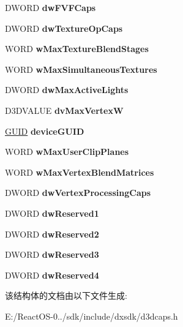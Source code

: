 \begin{DoxyCompactItemize}
D\+W\+O\+RD {\bfseries dw\+F\+V\+F\+Caps}
\item 
\mbox{\label{struct___d3_d_device_desc7_a92577a9b229bc365e67535f20320529f}} 
D\+W\+O\+RD {\bfseries dw\+Texture\+Op\+Caps}
\item 
\mbox{\label{struct___d3_d_device_desc7_aa52fdfb0dc28922bd58de3bf428ebde5}} 
W\+O\+RD {\bfseries w\+Max\+Texture\+Blend\+Stages}
\item 
\mbox{\label{struct___d3_d_device_desc7_a1a428ca5f09dbae0e6838d95a83d3f6e}} 
W\+O\+RD {\bfseries w\+Max\+Simultaneous\+Textures}
\item 
\mbox{\label{struct___d3_d_device_desc7_a74dd8fd7b928f20f76b94ab02b82de08}} 
D\+W\+O\+RD {\bfseries dw\+Max\+Active\+Lights}
\item 
\mbox{\label{struct___d3_d_device_desc7_af8748cda866462ea4e95cd61d3488007}} 
D3\+D\+V\+A\+L\+UE {\bfseries dv\+Max\+VertexW}
\item 
\mbox{\label{struct___d3_d_device_desc7_a38f18a2052de8d4eda540738034bbf5a}} 
\hyperlink{interface_g_u_i_d}{G\+U\+ID} {\bfseries device\+G\+U\+ID}
\item 
\mbox{\label{struct___d3_d_device_desc7_a5ad5b4e30bf5a6920aa0dfba96fb01e0}} 
W\+O\+RD {\bfseries w\+Max\+User\+Clip\+Planes}
\item 
\mbox{\label{struct___d3_d_device_desc7_ad108dbe10286ced64e1da8bb7844d7bc}} 
W\+O\+RD {\bfseries w\+Max\+Vertex\+Blend\+Matrices}
\item 
\mbox{\label{struct___d3_d_device_desc7_acb9ab618a042e630854d78c346e6f3a1}} 
D\+W\+O\+RD {\bfseries dw\+Vertex\+Processing\+Caps}
\item 
\mbox{\label{struct___d3_d_device_desc7_ad02c67820584114acde82860e8c4d697}} 
D\+W\+O\+RD {\bfseries dw\+Reserved1}
\item 
\mbox{\label{struct___d3_d_device_desc7_aa771d30bfc1c18d1f1567cba376c63a0}} 
D\+W\+O\+RD {\bfseries dw\+Reserved2}
\item 
\mbox{\label{struct___d3_d_device_desc7_ad31514149438fd0bc18eb5222c94c2b7}} 
D\+W\+O\+RD {\bfseries dw\+Reserved3}
\item 
\mbox{\label{struct___d3_d_device_desc7_acba9f882486629b1385cab47608ec3b6}} 
D\+W\+O\+RD {\bfseries dw\+Reserved4}
\end{DoxyCompactItemize}


该结构体的文档由以下文件生成\+:\begin{DoxyCompactItemize}
\item 
E\+:/\+React\+O\+S-\/0../sdk/include/dxsdk/d3dcaps.\+h\end{DoxyCompactItemize}

